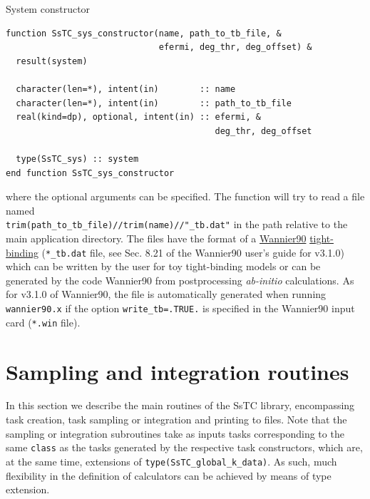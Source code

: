\documentclass[10pt,a4paper]{article}
\begin{document}
\begin{codebox}{System constructor}
\begin{lstlisting}[caption={Interface of the system constructor.},captionpos=b]
function SsTC_sys_constructor(name, path_to_tb_file, &
                              efermi, deg_thr, deg_offset) &
  result(system)

  character(len=*), intent(in)        :: name
  character(len=*), intent(in)        :: path_to_tb_file
  real(kind=dp), optional, intent(in) :: efermi, &
                                         deg_thr, deg_offset

  type(SsTC_sys) :: system
end function SsTC_sys_constructor
\end{lstlisting}
\end{codebox}
where the optional arguments can be specified. The function will try to read a file named \\ \verb|trim(path_to_tb_file)//trim(name)//"_tb.dat"| in the path relative to the main application directory. The files have the format of a \href{https://wannier.org/}{Wannier90} \cite{pizziWannier90CommunityCode2020} \href{https://raw.githubusercontent.com/wannier-developers/wannier90/v3.1.0/doc/compiled_docs/user_guide.pdf}{tight-binding} (\verb|*_tb.dat| file, see Sec. 8.21 of the Wannier90 user's guide for v3.1.0) which can be written by the user for toy tight-binding models or can be generated by the code Wannier90 from postprocessing \textit{ab-initio} calculations. As for v3.1.0 of Wannier90, the file is automatically generated when running \verb|wannier90.x| if the option \verb|write_tb=.TRUE.| is specified in the Wannier90 input card (\verb|*.win| file).
\section{Sampling and integration routines}\label{sec: sampling_integration}
In this section we describe the main routines of the SsTC library, encompassing task creation, task sampling or integration and printing to files. Note that the sampling or integration subroutines take as inputs tasks corresponding to the same \verb|class| as the tasks generated by the respective task constructors, which are, at the same time, extensions of \verb|type(SsTC_global_k_data)|. As such, much flexibility in the definition of calculators can be achieved by means of type extension.
\end{document}
